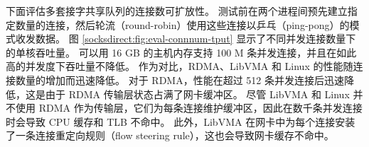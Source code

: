 %


下面评估多套接字共享队列的连接数可扩放性。
测试前在两个进程间预先建立指定数量的连接，然后轮流（round-robin）使用这些连接以乒乓（ping-pong）的模式收发数据。
图 \ref{socksdirect:fig:eval-connnum-tput} 显示了不同并发连接数量下的单核吞吐量。
\sys{} 可以用 16 GB 的主机内存支持 100 M 条并发连接，并且在如此高的并发度下吞吐量不降低。
作为对比，RDMA、LibVMA 和 Linux 的性能随连接数量的增加而迅速降低。
对于 RDMA，性能在超过 512 条并发连接后迅速降低，这是由于 RDMA 传输层状态占满了网卡缓冲区。
尽管 LibVMA 和 Linux 并不使用 RDMA 作为传输层，它们为每条连接维护缓冲区，因此在数千条并发连接时会导致 CPU 缓存和 TLB 不命中。
此外，LibVMA 在网卡中为每个连接安装了一条连接重定向规则（flow steering rule），这也会导致网卡缓存不命中。

